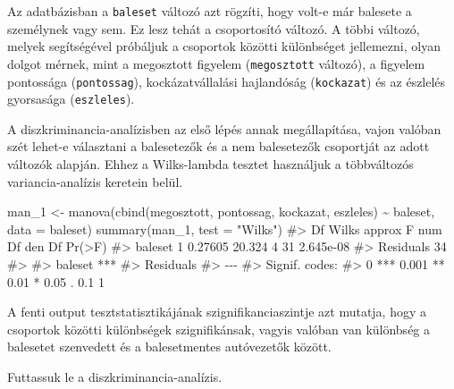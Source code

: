 \documentclass[
  letterpaper,
]{krantz}
\makeatletter
\newenvironment{Shaded}{\begin{snugshade}}{\end{snugshade}}
\newcommand{\AttributeTok}[1]{\textcolor[rgb]{0.40,0.45,0.13}{#1}}
\newcommand{\CommentTok}[1]{\textcolor[rgb]{0.37,0.37,0.37}{#1}}
\newcommand{\FunctionTok}[1]{\textcolor[rgb]{0.28,0.35,0.67}{#1}}
\newcommand{\NormalTok}[1]{\textcolor[rgb]{0.00,0.23,0.31}{#1}}
\newcommand{\OtherTok}[1]{\textcolor[rgb]{0.00,0.23,0.31}{#1}}
\newcommand{\SpecialCharTok}[1]{\textcolor[rgb]{0.37,0.37,0.37}{#1}}
\newcommand{\StringTok}[1]{\textcolor[rgb]{0.13,0.47,0.30}{#1}}
\newenvironment{kframe}{%
\medskip{}
\setlength{\fboxsep}{.8em}
 \def\at@end@of@kframe{}%
 \ifinner\ifhmode%
  \def\at@end@of@kframe{\end{minipage}}%
  \begin{minipage}{\columnwidth}%
 \fi\fi%
 \def\FrameCommand##1{\hskip\@totalleftmargin \hskip-\fboxsep
 \colorbox{shadecolor}{##1}\hskip-\fboxsep
     \hskip-\linewidth \hskip-\@totalleftmargin \hskip\columnwidth}%
 \MakeFramed {\advance\hsize-\width
   \@totalleftmargin\z@ \linewidth\hsize
   \@setminipage}}%
 {\par\unskip\endMakeFramed%
 \at@end@of@kframe}
\renewenvironment{Shaded}{\begin{kframe}}{\end{kframe}}
\makeatother
\begin{document}
Az adatbázisban a \texttt{baleset} változó azt rögzíti, hogy volt-e már
balesete a személynek vagy sem. Ez lesz tehát a csoportosító változó. A
többi változó, melyek segítségével próbáljuk a csoportok közötti
különbséget jellemezni, olyan dolgot mérnek, mint a megosztott figyelem
(\texttt{megosztott} változó), a figyelem pontossága
(\texttt{pontossag}), kockázatvállalási hajlandóság (\texttt{kockazat})
és az észlelés gyorsasága (\texttt{eszleles}).

A diszkriminancia-analízisben az első lépés annak megállapítása, vajon
valóban szét lehet-e választani a balesetezők és a nem balesetezők
csoportját az adott változók alapján. Ehhez a Wilks-lambda tesztet
használjuk a többváltozós variancia-analízis keretein belül.

\begin{Shaded}
\begin{Highlighting}[]
\NormalTok{man\_1 }\OtherTok{\textless{}{-}} \FunctionTok{manova}\NormalTok{(}\FunctionTok{cbind}\NormalTok{(megosztott, pontossag, kockazat, eszleles) }\SpecialCharTok{\textasciitilde{}}
\NormalTok{    baleset, }\AttributeTok{data =}\NormalTok{ baleset)}
\FunctionTok{summary}\NormalTok{(man\_1, }\AttributeTok{test =} \StringTok{"Wilks"}\NormalTok{)}
\CommentTok{\#\textgreater{}           Df   Wilks approx F num Df den Df    Pr(\textgreater{}F)}
\CommentTok{\#\textgreater{} baleset    1 0.27605   20.324      4     31 2.645e{-}08}
\CommentTok{\#\textgreater{} Residuals 34                                         }
\CommentTok{\#\textgreater{}              }
\CommentTok{\#\textgreater{} baleset   ***}
\CommentTok{\#\textgreater{} Residuals    }
\CommentTok{\#\textgreater{} {-}{-}{-}}
\CommentTok{\#\textgreater{} Signif. codes:  }
\CommentTok{\#\textgreater{} 0 \textquotesingle{}***\textquotesingle{} 0.001 \textquotesingle{}**\textquotesingle{} 0.01 \textquotesingle{}*\textquotesingle{} 0.05 \textquotesingle{}.\textquotesingle{} 0.1 \textquotesingle{} \textquotesingle{} 1}
\end{Highlighting}
\end{Shaded}

A fenti output tesztstatisztikájának szignifikanciaszintje azt mutatja,
hogy a csoportok közötti különbségek szignifikánsak, vagyis valóban van
különbség a balesetet szenvedett és a balesetmentes autóvezetők között.

Futtassuk le a diszkriminancia-analízis.
\end{document}
